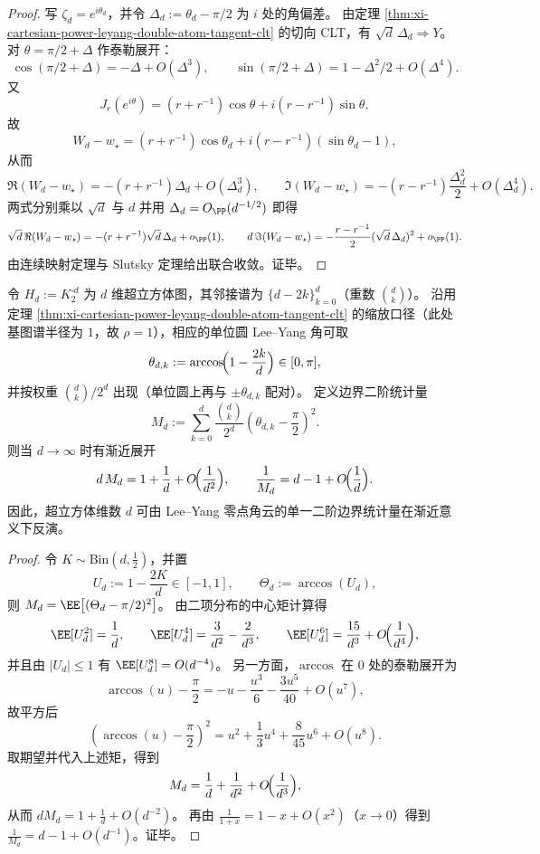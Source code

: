 \begin{proof}
写 \(\zeta_d=e^{i\theta_d}\)，并令 \(\Delta_d:=\theta_d-\pi/2\) 为 \(i\) 处的角偏差。
由定理 \ref{thm:xi-cartesian-power-leyang-double-atom-tangent-clt} 的切向 CLT，有 \(\sqrt d\,\Delta_d\Rightarrow Y\)。
对 \(\theta=\pi/2+\Delta\) 作泰勒展开：
\[
\cos(\pi/2+\Delta)=-\Delta+O(\Delta^3),
\qquad
\sin(\pi/2+\Delta)=1-\Delta^2/2+O(\Delta^4).
\]
又
\[
J_r(e^{i\theta})=(r+r^{-1})\cos\theta+i(r-r^{-1})\sin\theta,
\]
故
\[
W_d-w_\star
=(r+r^{-1})\cos\theta_d+i(r-r^{-1})(\sin\theta_d-1),
\]
从而
\[
\Re(W_d-w_\star)=-(r+r^{-1})\Delta_d+O(\Delta_d^3),
\qquad
\Im(W_d-w_\star)=-(r-r^{-1})\frac{\Delta_d^2}{2}+O(\Delta_d^4).
\]
两式分别乘以 \(\sqrt d\) 与 \(d\) 并用 \(\Delta_d=O_{\PP}(d^{-1/2})\) 即得
\[
\sqrt d\,\Re(W_d-w_\star)=-(r+r^{-1})\sqrt d\,\Delta_d+o_{\PP}(1),
\qquad
d\,\Im(W_d-w_\star)=-\frac{r-r^{-1}}{2}(\sqrt d\,\Delta_d)^2+o_{\PP}(1).
\]
由连续映射定理与 Slutsky 定理给出联合收敛。证毕。
\end{proof}

\begin{theorem}[超立方体维数的边界二阶统计可读出性]\label{thm:xi-hypercube-dimension-readable-from-leyang-angular-variance}
令 \(H_d:=K_2^{\square d}\) 为 \(d\) 维超立方体图，其邻接谱为 \(\{d-2k\}_{k=0}^{d}\)（重数 \(\binom{d}{k}\)）。
沿用定理 \ref{thm:xi-cartesian-power-leyang-double-atom-tangent-clt} 的缩放口径（此处基图谱半径为 \(1\)，故 \(\rho=1\)），相应的单位圆 Lee--Yang 角可取
\[
\theta_{d,k}:=\arccos\!\Bigl(1-\frac{2k}{d}\Bigr)\in[0,\pi],
\]
并按权重 \(\binom{d}{k}/2^d\) 出现（单位圆上再与 \(\pm\theta_{d,k}\) 配对）。
定义边界二阶统计量
\[
M_d:=\sum_{k=0}^{d}\frac{\binom{d}{k}}{2^d}\left(\theta_{d,k}-\frac{\pi}{2}\right)^2.
\]
则当 \(d\to\infty\) 时有渐近展开
\[
d\,M_d=1+\frac1d+O\!\Bigl(\frac1{d^2}\Bigr),
\qquad
\frac1{M_d}=d-1+O\!\Bigl(\frac1d\Bigr).
\]
因此，超立方体维数 \(d\) 可由 Lee--Yang 零点角云的单一二阶边界统计量在渐近意义下反演。
\end{theorem}

\begin{proof}
令 \(K\sim\mathrm{Bin}(d,\tfrac12)\)，并置
\[
U_d:=1-\frac{2K}{d}\in[-1,1],
\qquad
\Theta_d:=\arccos(U_d),
\]
则 \(M_d=\EE\bigl[(\Theta_d-\pi/2)^2\bigr]\)。
由二项分布的中心矩计算得
\[
\EE[U_d^2]=\frac1d,
\qquad
\EE[U_d^4]=\frac{3}{d^2}-\frac{2}{d^3},
\qquad
\EE[U_d^6]=\frac{15}{d^3}+O\!\Bigl(\frac1{d^4}\Bigr),
\]
并且由 \(|U_d|\le 1\) 有 \(\EE[U_d^8]=O(d^{-4})\)。
另一方面，\(\arccos\) 在 \(0\) 处的泰勒展开为
\[
\arccos(u)-\frac{\pi}{2}
=-u-\frac{u^3}{6}-\frac{3u^5}{40}+O(u^7),
\]
故平方后
\[
\left(\arccos(u)-\frac{\pi}{2}\right)^2
=u^2+\frac13u^4+\frac{8}{45}u^6+O(u^8).
\]
取期望并代入上述矩，得到
\[
M_d=\frac1d+\frac1{d^2}+O\!\Bigl(\frac1{d^3}\Bigr),
\]
从而 \(dM_d=1+\frac1d+O(d^{-2})\)。
再由 \(\frac1{1+x}=1-x+O(x^2)\)（\(x\to 0\)）得到 \(\frac1{M_d}=d-1+O(d^{-1})\)。证毕。
\end{proof}

